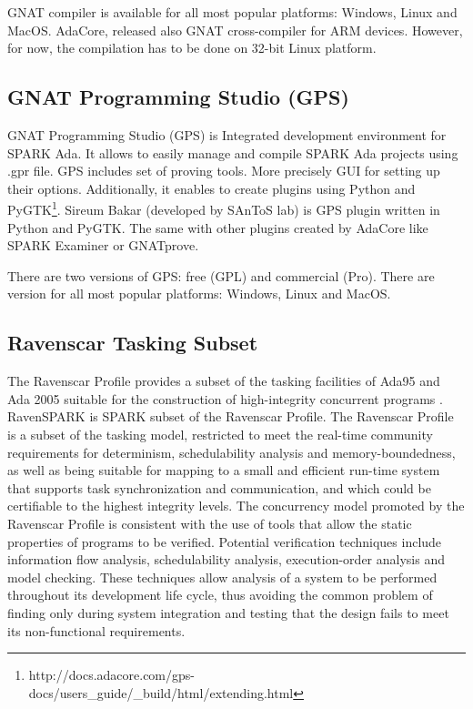 GNAT compiler is available for all most popular platforms: Windows, Linux and MacOS. AdaCore, released also GNAT cross-compiler for ARM devices. However, for now, the compilation has to be done on 32-bit Linux platform.


\subsection{GNAT Programming Studio (GPS)}
\label{background:spark:gps}

GNAT Programming Studio (GPS) is Integrated development environment for SPARK Ada. It allows to easily manage and compile SPARK Ada projects using .gpr file. GPS includes set of proving tools. More precisely GUI for setting up their options. Additionally, it enables to create plugins using Python and PyGTK\footnote{http://docs.adacore.com/gps-docs/users\_guide/\_build/html/extending.html}. Sireum Bakar (developed by SAnToS lab) is GPS plugin written in Python and PyGTK. The same with other plugins created by AdaCore like SPARK Examiner or GNATprove.

There are two versions of GPS: free (GPL) and commercial (Pro). There are version for all most popular platforms: Windows, Linux and MacOS.


\subsection{Ravenscar Tasking Subset}
\label{background:spark:ravenscar}

The Ravenscar Profile provides a subset of the tasking facilities of Ada95 and Ada 2005 suitable for the construction of high-integrity concurrent programs \cite{Ravenscar:Online}. RavenSPARK is SPARK subset of the Ravenscar Profile. The Ravenscar Profile is a subset of the tasking model, restricted to meet the real-time community requirements for determinism, schedulability analysis and memory-boundedness, as well as being suitable for mapping to a small and efficient run-time system that supports task synchronization and communication, and which could be certifiable to the highest integrity levels. The concurrency model promoted by the Ravenscar Profile is consistent with the use of tools that allow the static properties of programs to be verified. Potential verification techniques include information flow analysis, schedulability analysis, execution-order analysis and model checking. These techniques allow analysis of a system to be performed throughout its development life cycle, thus avoiding the common problem of finding only during system integration and testing that the design fails to meet its non-functional requirements. \cite{Ravenscar:Article}


